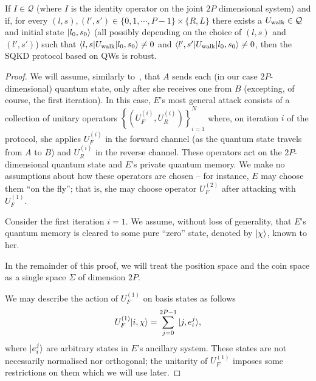 \begin{theorem}\label{thm:sqkd-robust}
If $I \in \mathcal{Q}$ (where $I$ is the identity operator on the joint $2P$ dimensional system) and if, for every $(l,s), (l',s') \in \{0,1,\cdots, P-1\}\times\{R,L\}$ there exists a $U_{\textnormal{walk}} \in \mathcal{Q}$ and initial state $| l_0,s_0 \rangle$ (all possibly depending on the choice of $(l,s)$ and $(l',s')$) such that $\braket{l,s|U_{\textnormal{walk}}|{l_0,s_0}} \ne 0$ and $\braket{l',s'|U_{\textnormal{walk}}|l_0,s_0} \ne 0$, then the SQKD protocol based on QWs is robust.
\end{theorem}
\begin{proof}

We will assume, similarly to~\cite{zou:qiu:li:wu:li:09,kra:14}, that $A$ sends each (in our case $2P$-dimensional) quantum state, only after she receives one from $B$ (excepting, of course, the first iteration).  In this case, $E$'s most general attack consists of a collection of unitary operators $\left\{(U_F^{(i)}, U_R^{(i)})\right\}_{i=1}^N$ where, on iteration $i$ of the protocol, she applies $U_F^{(i)}$ in the forward channel (as the quantum state travels from $A$ to $B$) and $U_R^{(i)}$ in the reverse channel.  These operators act on the $2P$-dimensional quantum state and $E$'s private quantum memory.  We make no assumptions about how these operators are chosen -- for instance, $E$ may choose them ``on the fly''; that is, she may choose operator $U_F^{(2)}$ after attacking with $U_F^{(1)}$.

Consider the first iteration $i=1$.  We assume, without loss of generality, that $E$'s quantum memory is cleared to some pure ``zero'' state, denoted by $| \chi \rangle$, known to her.

In the remainder of this proof, we will treat the position space and the coin space as a single space $\Sigma$ of dimension $2P$.

We may describe the action of $U_F^{(1)}$ on basis states as follows
\[
U_F^{(1)}| i, \chi \rangle = \sum_{j=0}^{2P-1}| j, e_i^j \rangle,
\]
where $| e_i^j \rangle$ are arbitrary states in $E$'s ancillary system. These states are not necessarily normalised nor orthogonal; the unitarity of $U_F^{(1)}$ imposes some restrictions on them which we will use later.


\end{proof}
